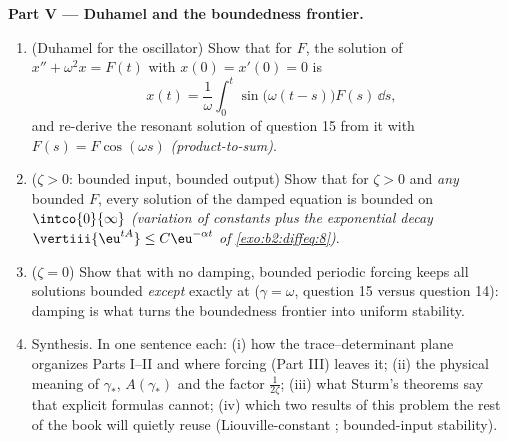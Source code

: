 \begin{problem}
\medskip
\noindent\textbf{Part V --- Duhamel and the boundedness
frontier.}
\begin{enumerate}[resume]
  \item (Duhamel for the oscillator) Show that for
         $F$, the solution of $x'' + \omega^2x =
        F(t)$ with $x(0) = x'(0) = 0$ is
        \[
        x(t) = \frac1\omega\int_0^t\sin\bigl(\omega(t -
        s)\bigr)F(s)\,\dd s ,
        \]
        and re-derive the resonant solution of question 15
        from it with $F(s) = F\cos(\omega s)$
        \emph{(product-to-sum)}.
  \item ($\zeta > 0$: bounded input, bounded output) Show
        that for $\zeta > 0$ and \emph{any} bounded 
        $F$, every solution of the damped equation is bounded
        on $\intco{0}{\infty}$ \emph{(variation of constants
        plus the exponential decay $\vertiii{\eu^{tA}} \leq
        C\eu^{-\alpha t}$ of \cref{exo:b2:diffeq:8})}.
  \item ($\zeta = 0$) Show that with no damping, bounded
        periodic forcing keeps all solutions bounded
        \emph{except} exactly at  ($\gamma =
        \omega$, question 15 versus question 14): damping is
        what turns the boundedness frontier into uniform
        stability.
  \item Synthesis. In one sentence each: (i) how the
        trace--determinant plane organizes Parts I--II and
        where forcing (Part III) leaves it; (ii) the
        physical meaning of $\gamma_*$, $A(\gamma_*)$ and
        the factor $\frac1{2\zeta}$; (iii) what Sturm's
        theorems say that explicit formulas cannot; (iv)
        which two results of this problem the rest of the
        book will quietly reuse (Liouville-constant
        ; bounded-input stability).
\end{enumerate}
\end{problem}
